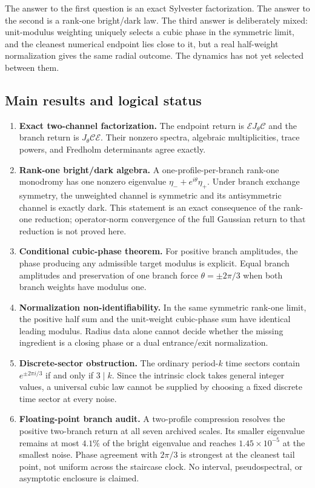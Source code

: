 \documentclass[11pt]{article}
\theoremstyle{definition}
\theoremstyle{remark}
\newcommand{\cC}{\mathcal C}
\newcommand{\cE}{\mathcal E}
\begin{document}
The answer to the first question is an exact Sylvester factorization.  The
answer to the second is a rank-one bright/dark law.  The third answer is
deliberately mixed: unit-modulus weighting uniquely selects a cubic phase in
the symmetric limit, and the cleanest numerical endpoint lies close to it,
but a real half-weight normalization gives the same radial outcome.  The
dynamics has not yet selected between them.

\subsection*{Main results and logical status}

\begin{enumerate}[label=\textbf{S\arabic*.},leftmargin=3.2em]
 \item \textbf{Exact two-channel factorization.}
 The endpoint return is $\cE J_\theta\cC$ and the branch return is
 $J_\theta\cC\cE$.  Their nonzero spectra, algebraic multiplicities, trace
 powers, and Fredholm determinants agree exactly.

 \item \textbf{Rank-one bright/dark algebra.}
 A one-profile-per-branch rank-one monodromy has one nonzero eigenvalue
 $\eta_-+e^{i\theta}\eta_+$.  Under branch exchange symmetry, the
 unweighted channel is symmetric and its antisymmetric channel is exactly
 dark.  This statement is an exact consequence of the rank-one reduction;
 operator-norm convergence of the full Gaussian return to that reduction is
 not proved here.

 \item \textbf{Conditional cubic-phase theorem.}
 For positive branch amplitudes, the phase producing any admissible target
 modulus is explicit.  Equal branch amplitudes and preservation of one
 branch force $\theta=\pm2\pi/3$ when both branch weights have modulus one.

 \item \textbf{Normalization non-identifiability.}
 In the same symmetric rank-one limit, the positive half sum and the
 unit-weight cubic-phase sum have identical leading modulus.  Radius data
 alone cannot decide whether the missing ingredient is a closing phase or a
 dual entrance/exit normalization.

 \item \textbf{Discrete-sector obstruction.}
 The ordinary period-$k$ time sectors contain $e^{\pm2\pi i/3}$ if and only
 if $3\mid k$.  Since the intrinsic clock takes general integer values, a
 universal cubic law cannot be supplied by choosing a fixed discrete time
 sector at every noise.

 \item \textbf{Floating-point branch audit.}
 A two-profile compression resolves the positive two-branch return at all
 seven archived scales.  Its smaller eigenvalue remains at most $4.1\%$ of
 the bright eigenvalue and reaches $1.45\times10^{-5}$ at the smallest
 noise.  Phase agreement with $2\pi/3$ is strongest at the cleanest tail
 point, not uniform across the staircase clock.  No interval,
 pseudospectral, or asymptotic enclosure is claimed.
\end{enumerate}
\end{document}
